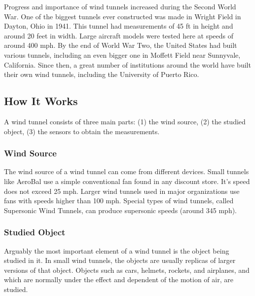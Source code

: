 	Progress and importance of wind tunnels increased during the Second World War. One of the biggest tunnels ever constructed was made in Wright Field in Dayton, Ohio in 1941. \cite{ref:wright3} 
	This tunnel had measurements of 45 ft in height and around 20 feet in width. Large aircraft models were tested here at speeds of around 400 mph. By the end of World War Two, the United States had built various tunnels, including an even bigger one in Moffett Field near Sunnyvale, California. Since then, a great number of institutions around the world have built their own wind tunnels, including the University of Puerto Rico.
	
	\subsection{How It Works}
	
	A wind tunnel consists of three main parts: (1) the wind source, (2) the studied object, (3) the sensors to obtain the measurements.

	\subsubsection{Wind Source}

	The wind source of a wind tunnel can come from different devices. Small tunnels like AeroBal use a simple conventional fan found in any discount store. It's speed does not exceed 25 mph. Larger wind tunnels used in major organizations use fans with speeds higher than 100 mph. Special types of wind tunnels, called Supersonic Wind Tunnels, can produce supersonic speeds (around 345 mph).  	
	
	\subsubsection{Studied Object}
	
	Arguably the most important element of a wind tunnel is the object being studied in it. In small wind tunnels, the objects are usually replicas of larger versions of that object. Objects such as cars, helmets, rockets, and airplanes, and which are normally under the effect and dependent of the motion of air, are studied.
	
